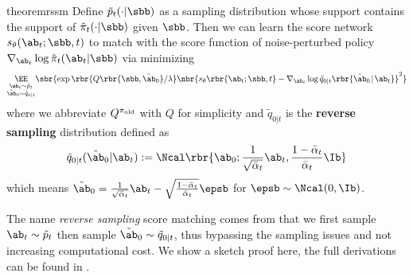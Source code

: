 \begin{restatable}{theorem}{rssm}
    Define $\tilde p_t(\cdot|\sbb)$ as a sampling distribution whose support contains the support of $\tilde\pi_t(\cdot|\sbb)$ given $\sbb$.
                        Then we can learn the score network $s_\theta(\ab_t;\sbb,t)$  to match with the score function of noise-perturbed policy $\nabla_{\ab_t}\log \tilde\pi_t(\ab_t|\sbb)$ via minimizing
    \begin{equation}
        \underset{\substack{\ab_t\sim \tilde p_t\\ \tilde\ab_0\sim\tilde q_{0|t}}}{\EE}\sbr{\exp \rbr{Q\rbr{\sbb, \tilde\ab_0}/\lambda}\nbr{s_\theta\rbr{\ab_t; \sbb, t} - \nabla_{\ab_t}\log \tilde q_{0|t}\rbr{\tilde\ab_0 \! \mid \! \ab_t}}^2}\label{eq:thm1_reweight_loss}
    \end{equation}
    where we abbreviate $Q^{\pi_{\rm old}}$ with $Q$ for simplicity and $\tilde q_{0|t}$ is the \textbf{reverse sampling} distribution defined as
                \begin{equation}
        \tilde q_{0|t}(\tilde\ab_0|\ab_t):=\Ncal\rbr{\ab_0;\frac{1}{\sqrt{\bar\alpha_t}}\ab_t, \frac{1 - \bar\alpha_t}{\bar\alpha_t}\Ib}\label{eq:a0_sample_thm}
    \end{equation}
    which means $ \tilde\ab_0 = \frac{1}{\sqrt{\bar\alpha_t}}\ab_t - \sqrt{\frac{1 - \bar\alpha_t}{\bar\alpha_t}}\epsb$ for $\epsb\sim\Ncal(0,\Ib)$.
\end{restatable}

The name \emph{reverse sampling} score matching comes from that we first sample $\ab_t\sim \tilde p_t$ then sample $\tilde\ab_0\sim\tilde q_{0|t}$, thus bypassing the sampling issues and not increasing computational cost. We show a sketch proof here, the full derivations can be found in .

